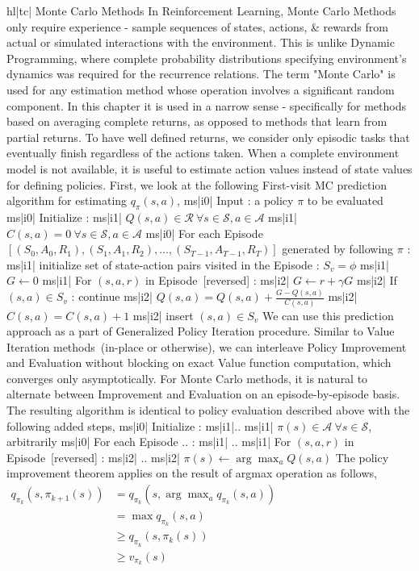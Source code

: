 hl|tc| Monte Carlo Methods
In Reinforcement Learning, Monte Carlo Methods only require experience - sample sequences of states, actions, & rewards from actual or simulated interactions with the environment. This is unlike Dynamic Programming, where complete probability distributions specifying environment's dynamics was required for the recurrence relations. The term "Monte Carlo" is used for any estimation method whose operation involves a significant random component. In this chapter it is used in a narrow sense - specifically for methods based on averaging complete returns, as opposed to methods that learn from partial returns. To have well defined returns, we consider only episodic tasks that eventually finish regardless of the actions taken.
When a complete environment model is not available, it is useful to estimate action values instead of state values for defining policies. First, we look at the following First-visit MC prediction algorithm for estimating \( q_\pi(s, a) \),
ms|i0| Input : a policy \( \pi \) to be evaluated
ms|i0| Initialize :
ms|i1| \( Q(s, a) \in \mathcal{R} \ \forall s \in \mathcal{S}, a \in \mathcal{A} \)
ms|i1| \( C(s, a) = 0 \ \forall s \in \mathcal{S}, a \in \mathcal{A} \)
ms|i0| For each Episode \([(S_0, A_0, R_1), (S_1, A_1, R_2),..., (S_{T-1}, A_{T-1}, R_T)] \) generated by following \( \pi \) :
ms|i1| initialize set of state-action pairs visited in the Episode : \( S_v = \phi \)
ms|i1| \( G \leftarrow 0 \)
ms|i1| For \( (s,a,r) \) in Episode [reversed] :
ms|i2| \( G \leftarrow r + \gamma G \)
ms|i2| If \( (s, a) \in S_v \) : continue
ms|i2| \( Q(s,a) = Q(s,a) + \frac{G - Q(s, a)}{C(s, a)} \)
ms|i2| \( C(s,a) = C(s, a) + 1 \)
ms|i2| insert \( (s,a) \in S_v \)
We can use this prediction approach as a part of Generalized Policy Iteration procedure. Similar to Value Iteration methods (in-place or otherwise), we can interleave Policy Improvement and Evaluation without blocking on exact Value function computation, which converges only asymptotically. For Monte Carlo methods, it is natural to alternate between Improvement and Evaluation on an episode-by-episode basis. The resulting algorithm is identical to policy evaluation described above with the following added steps,
ms|i0| Initialize :
ms|i1|..
ms|i1| \( \pi(s) \in \mathcal{A} \ \forall s \in \mathcal{S}\), arbitrarily
ms|i0| For each Episode .. :
ms|i1| ..
ms|i1| For \( (s, a, r) \) in Episode [reversed] :
ms|i2| ..
ms|i2| \( \pi(s) \leftarrow \arg \max_a Q(s, a) \)
The policy improvement theorem applies on the result of argmax operation as follows,
\( \begin{aligned} q_{\pi_k} (s, \pi_{k+1}(s)) &= q_{\pi_k} (s, \arg\max_a q_{\pi_k} (s, a)) \\ &= \max q_{\pi_k} (s, a) \\ &\ge q_{\pi_k} (s, \pi_k(s)) \\ &\ge v_{\pi_k} (s) \end{aligned} \)
